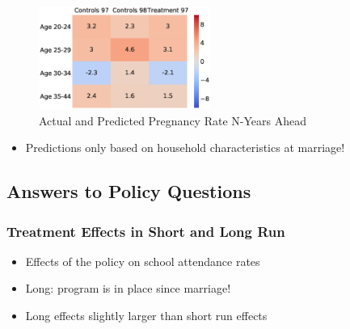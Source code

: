 \documentclass[11pt]{beamer}
\begin{document}
\begin{frame}[c]%
    \begin{figure}
        \centering
        \caption{Actual and Predicted Pregnancy Rate N-Years Ahead}
            \includegraphics[width=0.5\textwidth]{graphs/girls_table2_pregnancy.eps}
\end{figure}

\begin{itemize}
    \item Predictions only based on household characteristics at marriage!
\end{itemize}
\end{frame}




\subsection{Answers to Policy Questions}

\begin{frame}[c]\frametitle{Treatment Effects in Short and Long Run}
    \center{
    \resizebox{0.7\textwidth}{!}{}}
    \vspace{0.7cm}
    \begin{itemize}
        \item Effects of the policy on school attendance rates
        \item Long: program is in place since marriage!
        \item Long effects slightly larger than short run effects
    \end{itemize}
\end{frame}
\end{document}
